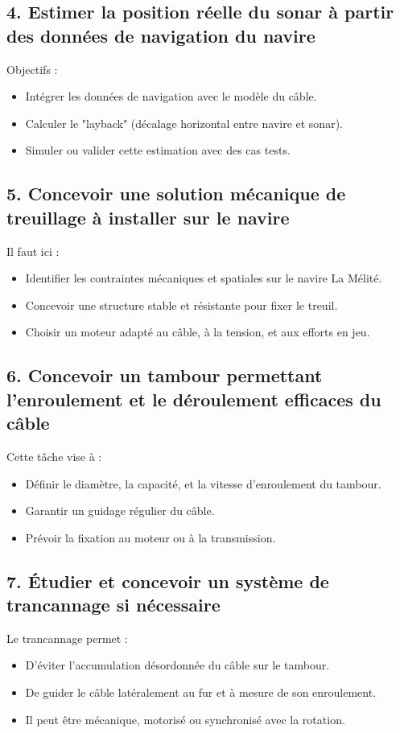 \documentclass[a4paper,11pt]{article}
\begin{document}
\subsection*{4. Estimer la position réelle du sonar à partir des données de navigation du navire}
Objectifs :
\begin{itemize}
  \item Intégrer les données de navigation avec le modèle du câble.
  \item Calculer le "layback" (décalage horizontal entre navire et sonar).
  \item Simuler ou valider cette estimation avec des cas tests.
\end{itemize}

\subsection*{5. Concevoir une solution mécanique de treuillage à installer sur le navire}
Il faut ici :
\begin{itemize}
  \item Identifier les contraintes mécaniques et spatiales sur le navire La Mélité.
  \item Concevoir une structure stable et résistante pour fixer le treuil.
  \item Choisir un moteur adapté au câble, à la tension, et aux efforts en jeu.
\end{itemize}

\subsection*{6. Concevoir un tambour permettant l'enroulement et le déroulement efficaces du câble}
Cette tâche vise à :
\begin{itemize}
  \item Définir le diamètre, la capacité, et la vitesse d’enroulement du tambour.
  \item Garantir un guidage régulier du câble.
  \item Prévoir la fixation au moteur ou à la transmission.
\end{itemize}

\subsection*{7. Étudier et concevoir un système de trancannage si nécessaire}
Le trancannage permet :
\begin{itemize}
  \item D’éviter l’accumulation désordonnée du câble sur le tambour.
  \item De guider le câble latéralement au fur et à mesure de son enroulement.
  \item Il peut être mécanique, motorisé ou synchronisé avec la rotation.
\end{itemize}
\end{document}
